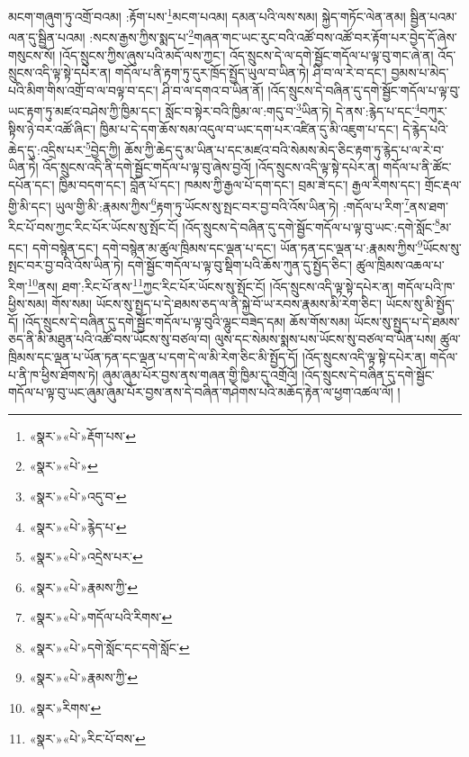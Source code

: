 མངག་གཞུག་ཏུ་འགྲོ་བའམ། :རྟོག་པས་\footnote{«སྣར་»«པེ་»རྡོག་པས་}མངག་པའམ། དམན་པའི་ལས་སམ། སྐྱེད་གཏོང་ལེན་ནམ། སྦྱིན་པའམ་ལན་དུ་སྦྱིན་པའམ། :སངས་རྒྱས་ཀྱིས་སྨད་པ་\footnote{«སྣར་»«པེ་»}གཞན་གང་ཡང་རུང་བའི་འཚོ་བས་འཚོ་བར་རྟོག་པར་བྱེད་དོ་ཞེས་གསུངས་སོ། །འོད་སྲུངས་ཀྱིས་ཞུས་པའི་མདོ་ལས་ཀྱང་། འོད་སྲུངས་དེ་ལ་དགེ་སྦྱོང་གདོལ་པ་ལྟ་བུ་གང་ཞེ་ན། འོད་སྲུངས་འདི་ལྟ་སྟེ་དཔེར་ན། གདོལ་པ་ནི་རྟག་ཏུ་དུར་ཁྲོད་སྤྱོད་ཡུལ་བ་ཡིན་ཏེ། ཤི་བ་ལ་རེ་བ་དང་། བྱམས་པ་མེད་པའི་མིག་གིས་འགྲོ་བ་ལ་བལྟ་བ་དང་། ཤི་བ་ལ་དགའ་བ་ཡིན་ནོ། །འོད་སྲུངས་དེ་བཞིན་དུ་དགེ་སྦྱོང་གདོལ་པ་ལྟ་བུ་ཡང་རྟག་ཏུ་མཛའ་བཤེས་ཀྱི་ཁྱིམ་དང་། སློང་བ་སྟེར་བའི་ཁྱིམ་ལ་:གདུ་བ་\footnote{«སྣར་»«པེ་»འདུ་བ་}ཡིན་ཏེ། དེ་ནས་:རྙེད་པ་དང་\footnote{«སྣར་»«པེ་»རྙེད་པ་}བཀུར་སྟིས་ཉེ་བར་འཚོ་ཞིང་། ཁྱིམ་པ་དེ་དག་ཆོས་སམ་འདུལ་བ་ཡང་དག་པར་འཛིན་དུ་མི་འཇུག་པ་དང་། དེ་རྙེད་པའི་ཆེད་དུ་:འདྲིས་པར་\footnote{«སྣར་»«པེ་»འདྲེས་པར་}བྱེད་ཀྱི། ཆོས་ཀྱི་ཆེད་དུ་མ་ཡིན་པ་དང་མཛའ་བའི་སེམས་མེད་ཅིང་རྟག་ཏུ་རྙེད་པ་ལ་རེ་བ་ཡིན་ཏེ། འོད་སྲུངས་འདི་ནི་དགེ་སྦྱོང་གདོལ་པ་ལྟ་བུ་ཞེས་བྱའོ། །འོད་སྲུངས་འདི་ལྟ་སྟེ་དཔེར་ན། གདོལ་པ་ནི་ཚོང་དཔོན་དང་། ཁྱིམ་བདག་དང་། བློན་པོ་དང་། ཁམས་ཀྱི་རྒྱལ་པོ་དག་དང་། བྲམ་ཟེ་དང་། རྒྱལ་རིགས་དང་། གྲོང་རྡལ་གྱི་མི་དང་། ཡུལ་གྱི་མི་:རྣམས་ཀྱིས་\footnote{«སྣར་»«པེ་»རྣམས་ཀྱི་}རྟག་ཏུ་ཡོངས་སུ་སྤང་བར་བྱ་བའི་འོས་ཡིན་ཏེ། :གདོལ་པ་རིག་\footnote{«སྣར་»«པེ་»གདོལ་པའི་རིགས་}ནས་ཐག་རིང་པོ་བས་ཀྱང་རིང་པོར་ཡོངས་སུ་སྤོང་ངོ། །འོད་སྲུངས་དེ་བཞིན་དུ་དགེ་སྦྱོང་གདོལ་པ་ལྟ་བུ་ཡང་:དགེ་སློང་\footnote{«སྣར་»«པེ་»དགེ་སློང་དང་དགེ་སློང་}མ་དང་། དགེ་བསྙེན་དང་། དགེ་བསྙེན་མ་ཚུལ་ཁྲིམས་དང་ལྡན་པ་དང་། ཡོན་ཏན་དང་ལྡན་པ་:རྣམས་ཀྱིས་\footnote{«སྣར་»«པེ་»རྣམས་ཀྱི་}ཡོངས་སུ་སྤང་བར་བྱ་བའི་འོས་ཡིན་ཏེ། དགེ་སྦྱོང་གདོལ་པ་ལྟ་བུ་སྡིག་པའི་ཆོས་ཀུན་དུ་སྤྱོད་ཅིང་། ཚུལ་ཁྲིམས་འཆལ་པ་རིག་\footnote{«སྣར་»རིགས་}ནས། ཐག་:རིང་པོ་ནས་\footnote{«སྣར་»«པེ་»རིང་པོ་བས་}ཀྱང་རིང་པོར་ཡོངས་སུ་སྤོང་ངོ། །འོད་སྲུངས་འདི་ལྟ་སྟེ་དཔེར་ན། གདོལ་པའི་ཁ་ཕྱིས་སམ། གོས་སམ། ཡོངས་སུ་སྤྱད་པ་དེ་ཐམས་ཅད་ལ་ནི་སྐྱེ་བོ་ཡ་རབས་རྣམས་མི་རེག་ཅིང་། ཡོངས་སུ་མི་སྤྱོད་དོ། །འོད་སྲུངས་དེ་བཞིན་དུ་དགེ་སྦྱོང་གདོལ་པ་ལྟ་བུའི་ལྷུང་བཟེད་དམ། ཆོས་གོས་སམ། ཡོངས་སུ་སྤྱད་པ་དེ་ཐམས་ཅད་ནི་མི་མཐུན་པའི་འཚོ་བས་ཡོངས་སུ་བཙལ་བ། ལུས་དང་སེམས་སྨས་པས་ཡོངས་སུ་བཙལ་བ་ཡིན་པས། ཚུལ་ཁྲིམས་དང་ལྡན་པ་ཡོན་ཏན་དང་ལྡན་པ་དག་དེ་ལ་མི་རེག་ཅིང་མི་སྤྱོད་དོ། །འོད་སྲུངས་འདི་ལྟ་སྟེ་དཔེར་ན། གདོལ་པ་ནི་ཁ་ཕྱིས་ཐོགས་ཏེ། ཞུམ་ཞུམ་པོར་བྱས་ནས་གཞན་གྱི་ཁྱིམ་དུ་འགྲོའོ། །འོད་སྲུངས་དེ་བཞིན་དུ་དགེ་སྦྱོང་གདོལ་པ་ལྟ་བུ་ཡང་ཞུམ་ཞུམ་པོར་བྱས་ནས་དེ་བཞིན་གཤེགས་པའི་མཆོད་རྟེན་ལ་ཕྱག་འཚལ་ལོ། །
